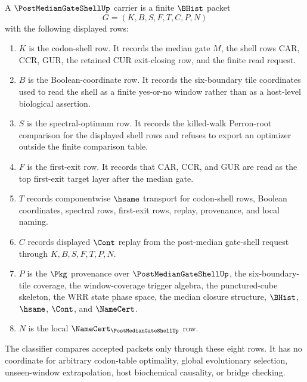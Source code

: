 \begin{definition}
\label{def:post-median-gate-shell-carrier}
A $\PostMedianGateShellUp$ carrier is a finite $\BHist$ packet
$$
G=(K,B,S,F,T,C,P,N)
$$
with the following displayed rows:
\begin{enumerate}
\item $K$ is the codon-shell row. It records the median gate $M$, the shell rows $\mathrm{CAR}$, $\mathrm{CCR}$, $\mathrm{GUR}$, the retained $\mathrm{CUR}$ exit-closing row, and the finite read request.
\item $B$ is the Boolean-coordinate row. It records the six-boundary tile coordinates used to read the shell as a finite yes-or-no window rather than as a host-level biological assertion.
\item $S$ is the spectral-optimum row. It records the killed-walk Perron-root comparison for the displayed shell rows and refuses to export an optimizer outside the finite comparison table.
\item $F$ is the first-exit row. It records that $\mathrm{CAR}$, $\mathrm{CCR}$, and $\mathrm{GUR}$ are read as the top first-exit target layer after the median gate.
\item $T$ records componentwise $\hsame$ transport for codon-shell rows, Boolean coordinates, spectral rows, first-exit rows, replay, provenance, and local naming.
\item $C$ records displayed $\Cont$ replay from the post-median gate-shell request through $K,B,S,F,T,P,N$.
\item $P$ is the $\Pkg$ provenance over $\PostMedianGateShellUp$, the six-boundary-tile coverage, the window-coverage trigger algebra, the punctured-cube skeleton, the WRR state phase space, the median closure structure, $\BHist$, $\hsame$, $\Cont$, and $\NameCert$.
\item $N$ is the local $\NameCert_{\PostMedianGateShellUp}$ row.
\end{enumerate}
The classifier compares accepted packets only through these eight rows. It has no coordinate for arbitrary codon-table optimality, global evolutionary selection, unseen-window extrapolation, host biochemical causality, or bridge checking.
\end{definition}

